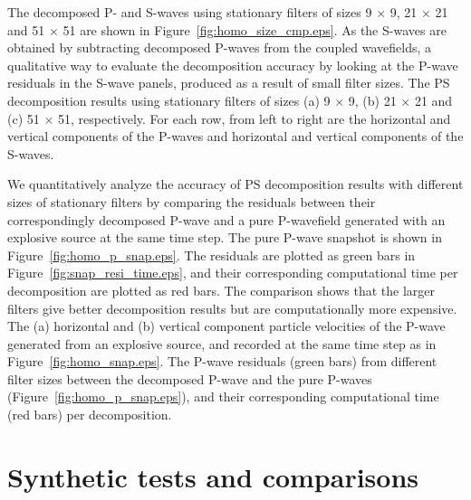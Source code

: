 \documentclass[manuscript,ulem,graphix,revised]{geophysics}
\begin{document}
The decomposed P- and S-waves using stationary filters of sizes 9 $\times$ 9, 21 $\times$ 21 and 51 $\times$ 51 are shown in Figure~\ref{fig:homo_size_cmp.eps}. As the S-waves are obtained by subtracting decomposed P-waves from the coupled wavefields, a qualitative way to evaluate the decomposition accuracy by looking at the P-wave residuals in the S-wave panels, produced as a result of small filter sizes.
{
The PS decomposition results using stationary filters of sizes (a) 9 $\times$ 9, (b) 21 $\times$ 21 and (c) 51 $\times$ 51, respectively. For each row, from left to right are the horizontal and vertical components of the P-waves and horizontal and vertical components of the S-waves.
}
  
We quantitatively analyze the accuracy of PS decomposition results with different sizes of stationary filters by comparing the residuals between their correspondingly decomposed P-wave and a pure P-wavefield generated with an explosive source at the same time step. The pure P-wave snapshot is shown in Figure~\ref{fig:homo_p_snap.eps}. 
The residuals are plotted as green bars in Figure~\ref{fig:snap_resi_time.eps}, and their corresponding computational time per decomposition are plotted as red bars. The comparison shows that the larger filters give better decomposition results but are computationally more expensive.
{
The (a) horizontal and (b) vertical component particle velocities of the P-wave generated from an explosive source, and recorded at the same time step as in Figure~\ref{fig:homo_snap.eps}.
}
{
The P-wave residuals (green bars) from different filter sizes between the decomposed P-wave and the pure P-waves (Figure~\ref{fig:homo_p_snap.eps}), and their corresponding computational time (red bars) per decomposition.
}

%
%
\section{Synthetic tests and comparisons}
\end{document}
